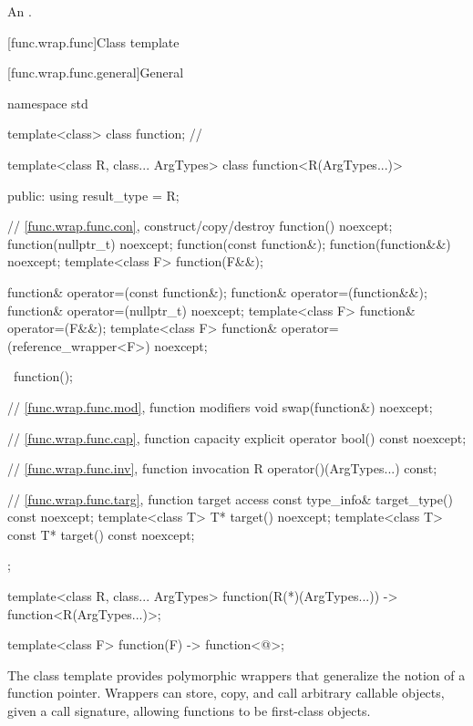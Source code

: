 \begin{itemdescr}
\pnum
\returns
An
 \ntbs{}.
\end{itemdescr}

[func.wrap.func]{Class template }

[func.wrap.func.general]{General}
%

%
\begin{codeblock}
namespace std {
  template<class> class function;       // \notdef

  template<class R, class... ArgTypes>
  class function<R(ArgTypes...)> {
  public:
    using result_type = R;

    // \ref{func.wrap.func.con}, construct/copy/destroy
    function() noexcept;
    function(nullptr_t) noexcept;
    function(const function&);
    function(function&&) noexcept;
    template<class F> function(F&&);

    function& operator=(const function&);
    function& operator=(function&&);
    function& operator=(nullptr_t) noexcept;
    template<class F> function& operator=(F&&);
    template<class F> function& operator=(reference_wrapper<F>) noexcept;

    ~function();

    // \ref{func.wrap.func.mod}, function modifiers
    void swap(function&) noexcept;

    // \ref{func.wrap.func.cap}, function capacity
    explicit operator bool() const noexcept;

    // \ref{func.wrap.func.inv}, function invocation
    R operator()(ArgTypes...) const;

    // \ref{func.wrap.func.targ}, function target access
    const type_info& target_type() const noexcept;
    template<class T>       T* target() noexcept;
    template<class T> const T* target() const noexcept;
  };

  template<class R, class... ArgTypes>
    function(R(*)(ArgTypes...)) -> function<R(ArgTypes...)>;

  template<class F> function(F) -> function<@\seebelow@>;
}
\end{codeblock}

\pnum
The  class template provides polymorphic wrappers that
generalize the notion of a function pointer. Wrappers can store, copy,
and call arbitrary callable objects, given a call
signature, allowing functions to be first-class objects.

